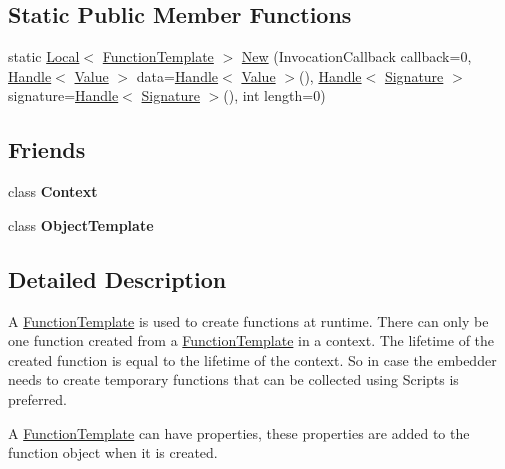 \subsection*{Static Public Member Functions}
\begin{DoxyCompactItemize}
\item 
static \hyperlink{classv8_1_1_local}{Local}$<$ \hyperlink{classv8_1_1_function_template}{Function\+Template} $>$ \hyperlink{classv8_1_1_function_template_aca42d56ea5d491bd7beacfd513b13555}{New} (Invocation\+Callback callback=0, \hyperlink{classv8_1_1_handle}{Handle}$<$ \hyperlink{classv8_1_1_value}{Value} $>$ data=\hyperlink{classv8_1_1_handle}{Handle}$<$ \hyperlink{classv8_1_1_value}{Value} $>$(), \hyperlink{classv8_1_1_handle}{Handle}$<$ \hyperlink{classv8_1_1_signature}{Signature} $>$ signature=\hyperlink{classv8_1_1_handle}{Handle}$<$ \hyperlink{classv8_1_1_signature}{Signature} $>$(), int length=0)
\end{DoxyCompactItemize}
\subsection*{Friends}
\begin{DoxyCompactItemize}
\item 
\hypertarget{classv8_1_1_function_template_ac26c806e60ca4a0547680edb68f6e39b}{}class {\bfseries Context}\label{classv8_1_1_function_template_ac26c806e60ca4a0547680edb68f6e39b}

\item 
\hypertarget{classv8_1_1_function_template_a4d28646409234f556983be8a96c06424}{}class {\bfseries Object\+Template}\label{classv8_1_1_function_template_a4d28646409234f556983be8a96c06424}

\end{DoxyCompactItemize}


\subsection{Detailed Description}
A \hyperlink{classv8_1_1_function_template}{Function\+Template} is used to create functions at runtime. There can only be one function created from a \hyperlink{classv8_1_1_function_template}{Function\+Template} in a context. The lifetime of the created function is equal to the lifetime of the context. So in case the embedder needs to create temporary functions that can be collected using Scripts is preferred.

A \hyperlink{classv8_1_1_function_template}{Function\+Template} can have properties, these properties are added to the function object when it is created.

